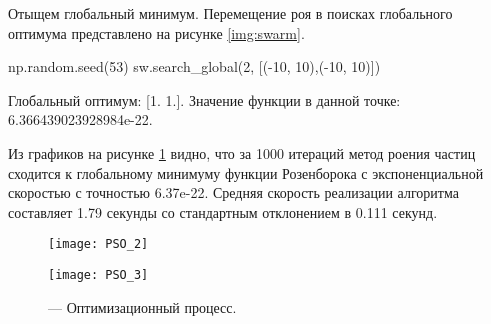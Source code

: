 Отыщем глобальный минимум. Перемещение роя в поисках глобального оптимума представлено на рисунке \ref{img:swarm}.
\begin{pyin}
np.random.seed(53)
sw.search_global(2, [(-10, 10),(-10, 10)])
\end{pyin}

\begin{pyout}
Глобальный оптимум: [1. 1.].
Значение функции в данной точке: 6.366439023928984e-22.
\end{pyout}

Из графиков на рисунке \ref{img:PSO} видно, что за 1000 итераций метод роения частиц сходится к глобальному минимуму функции Розенборока с экспоненциальной скоростью с точностью 6.37e-22. Средняя скорость реализации алгоритма составляет 1.79 секунды со стандартным отклонением в 0.111 секунд.

\begin{figure}[ht]
  \begin{minipage}[ht]{0.49\linewidth}\centering
    \texttt{[image: PSO\_2]}
  \end{minipage}
  \hfill
  \begin{minipage}[ht]{0.49\linewidth}\centering
    \texttt{[image: PSO\_3]}
  \end{minipage}
  \caption{ --- Оптимизационный процесс.}
  \label{img:PSO}
\end{figure}
